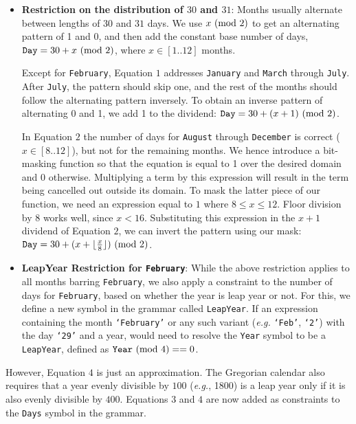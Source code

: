 \begin{itemize}
\setlength\itemsep{0em}
\item \textbf{Restriction on the distribution of $30$ and $31$}:
Months usually alternate between lengths of $30$ and $31$ days. We use $x \ (\text{mod}\ 2)$ to get an alternating pattern of 1 and 0, and then add the constant base number of days, $\texttt{Day} = 30 + x \ (\text{mod}\ 2)$, where $x \in [1..12]$ months.

Except for \texttt{February}, Equation $1$ addresses \texttt{January} and \texttt{March} through \texttt{July}. After \texttt{July}, the pattern should skip one, and the rest of the months should follow the alternating pattern inversely. To obtain an inverse pattern of alternating 0 and 1, we add 1 to the dividend:
$\texttt{Day} = 30 + (x + 1) \ (\text{mod}\ 2)$.

In Equation $2$ the number of days for \texttt{August} through \texttt{December} is correct ($x \in [8..12]$), but not for the remaining months. We hence introduce a bit-masking function so that the equation is equal to 1 over the desired domain and 0 otherwise. Multiplying a term by this expression will result in the term being cancelled out outside its domain. To mask the latter piece of our function, we need an expression equal to $1$ where $8 \le x\le 12$. Floor division by 8 works well, since $x < 16$. Substituting this expression in the $x + 1$ dividend of Equation $2$, we can invert the pattern using our mask: $\texttt{Day} = 30 + (x + \lfloor\frac{x}{8}\rfloor) \ (\text{mod}\ 2)$.


\item \textbf{LeapYear Restriction for \texttt{February}}:
While the above restriction applies to all months barring \texttt{February}, we also apply a constraint to the number of days for \texttt{February}, based on whether the year is leap year or not. For this, we define a new symbol in the grammar called \texttt{LeapYear}. If an expression containing the month \texttt{`February'} or any such variant (\textit{e.g.} \texttt{`Feb'}, \texttt{`2'}) with the day \texttt{`29'} and a year, would need to resolve the \texttt{Year} symbol to be a \texttt{LeapYear}, defined as $\texttt{Year} \ (\text{mod}\ 4) == 0$.
\end{itemize}

However, Equation $4$ is just an approximation. The Gregorian calendar also requires that a year evenly divisible by $100$ (\textit{e.g.}, 1800) is a leap year only if it is also evenly divisible by $400$. Equations $3$ and $4$ are now added as constraints to the \texttt{Days} symbol in the grammar.

